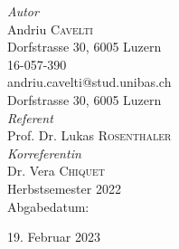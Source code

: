 \begin{center}
	\large
	  \textit{Autor}\\
	  Andriu \textsc{Cavelti}\\
	  Dorfstrasse 30, 6005 Luzern\\
	  16-057-390\\
	  andriu.cavelti@stud.unibas.ch\\
	  Dorfstrasse 30, 6005 Luzern\\[1.5cm]

	  \textit{Referent}\\
	  Prof. Dr. Lukas \textsc{Rosenthaler}\\[0.5cm]
	  \textit{Korreferentin}\\
		Dr. Vera \textsc{Chiquet}\\[1.5cm]


	Herbstsemester 2022\\
	Abgabedatum: {\large\date 019. Februar 2023}\\[1cm]

	\end{center}

\restoregeometry

\newpage

